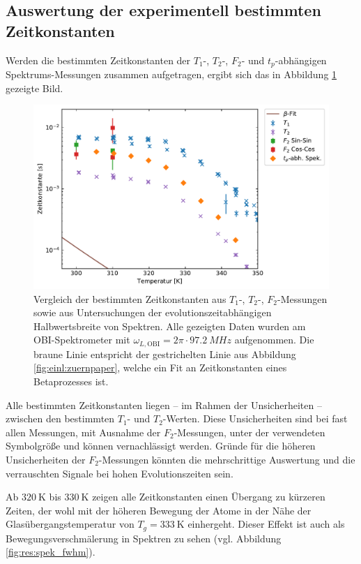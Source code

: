 \subsection{Auswertung der experimentell bestimmten Zeitkonstanten} \label{section:res:dynausw}

Werden die bestimmten Zeitkonstanten der $T_1$-, $T_2$-, $F_2$- und $t_p$-abhängigen Spek\-trums-Mess\-un\-gen zusammen aufgetragen, ergibt sich das in Abbildung \ref{fig:res:dynvgl} gezeigte Bild.
\begin{figure}
	\begin{center}
		\includegraphics[width=.9\textwidth]{graphics/plot/dyn.pdf}
	\end{center}
	\caption{Vergleich der bestimmten Zeitkonstanten aus $T_1$-, $T_2$-, $F_2$-Messungen sowie aus Untersuchungen der evolutionszeitabhängigen Halbwertsbreite von Spektren. Alle gezeigten Daten wurden am OBI-Spektrometer mit $\omega_{L, \text{OBI}} = 2\pi \cdot \SI{97.2}{MHz}$ aufgenommen. Die braune Linie entspricht der gestrichelten Linie aus Abbildung \ref{fig:einl:zuernpaper}, welche ein Fit an Zeitkonstanten eines Betaprozesses ist.} \label{fig:res:dynvgl}
\end{figure}
Alle bestimmten Zeitkonstanten liegen -- im Rahmen der Unsicherheiten -- zwischen den bestimmten $T_1$- und $T_2$-Werten. Diese Unsicherheiten sind bei fast allen Messungen, mit Ausnahme der $F_2$-Messungen, unter der verwendeten Symbolgröße und können vernachlässigt werden. Gründe für die höheren Unsicherheiten der $F_2$-Messungen könnten die mehrschrittige Auswertung und die verrauschten Signale bei hohen Evolutionszeiten sein.

Ab $\SI{320}{\kelvin}$ bis $\SI{330}{\kelvin}$ zeigen alle Zeitkonstanten einen Übergang zu kürzeren Zeiten, der wohl mit der höheren Bewegung der Atome in der Nähe der Glasübergangstemperatur von $T_g = \SI{333}{\kelvin}$ einhergeht. Dieser Effekt ist auch als Bewegungsverschmälerung in Spektren zu sehen (vgl. Abbildung \ref{fig:res:spek_fwhm}).

